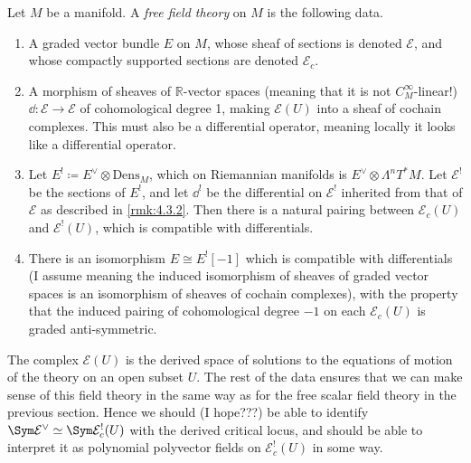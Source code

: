 \begin{definition}\label{dfn:4.3.1}
	Let $M$ be a manifold. A \emph{free field theory} on $M$ is the following data.
	\begin{enumerate}
		\item A graded vector bundle $E$ on $M$, whose sheaf of sections is denoted $\mathcal{E} $, and whose compactly supported sections are denoted $\mathcal{E} _c$.
		\item A morphism of sheaves of $\mathbb{R} $-vector spaces (meaning that it is not $C^\infty _M$-linear!) $\dd : \mathcal{E}  \to \mathcal{E} $ of cohomological degree 1, making $\mathcal{E} (U)$ into a sheaf of cochain complexes. This must also be a differential operator, meaning locally it looks like a differential operator.
		\item Let $E^! \coloneqq E^\vee \otimes \mathrm{Dens}_M$, which on Riemannian manifolds is $E^\vee \otimes \Lambda ^nT^*M$. Let $\mathcal{E} ^!$ be the sections of $E^!$, and let $\dd ^!$ be the differential on $\mathcal{E} ^!$ inherited from that of $\mathcal{E} $ as described in \cref{rmk:4.3.2}. Then there is a natural pairing between $\mathcal{E} _c(U)$ and $\mathcal{E} ^!(U)$, which is compatible with differentials.
		\item There is an isomorphism $E \cong E^![-1]$ which is compatible with differentials (I assume meaning the induced isomorphism of sheaves of graded vector spaces is an isomorphism of sheaves of cochain complexes), with the property that the induced pairing of cohomological degree $-1$ on each $\mathcal{E} _c(U)$ is graded anti-symmetric.
	\end{enumerate}
\end{definition}

The complex $\mathcal{E} (U)$ is the derived space of solutions to the equations of motion of the theory on an open subset $U$. The rest of the data ensures that we can make sense of this field theory in the same way as for the free scalar field theory in the previous section. Hence we should (I hope???) be able to identify $\Sym \mathcal{E} ^\vee \simeq \Sym \mathcal{E} _c^!(U)$ with the derived critical locus, and should be able to interpret it as polynomial polyvector fields on $\mathcal{E} _c^!(U)$ in some way.

